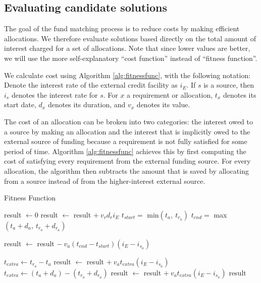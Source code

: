 \documentclass{sig-alternate}
\begin{document}
\subsection{Evaluating candidate solutions}
The goal of the fund matching process is to reduce costs by making efficient allocations. We therefore evaluate solutions based directly on the total amount of interest charged for a set of allocations. Note that since lower values are better, we will use the more self-explanatory ``cost function'' instead of ``fitness function''.

We calculate cost using Algorithm \ref{alg:fitnessfunc}, with the following notation: \\
Denote the interest rate of the external credit facility as $i_{E}$. If $s$ is a source, then $i_s$ denotes the interest rate for $s$. For $x$ a requirement or allocation, $t_x$ denotes its start date, $d_x$ denotes its duration, and $v_x$ denotes its value.

The cost of an allocation can be broken into two categories: the interest owed to a source by making an allocation and the interest that is implicitly owed to the external source of funding because a requirement is not fully satisfied for some period of time. Algorithm \ref{alg:fitnessfunc} achieves this by first computing the cost of satisfying every requirement  from the external funding source. For every allocation, the algorithm then subtracts the amount that is saved by allocating from a source instead of from the higher-interest external source.
\begin{algorithm}
\caption{Fitness Function} \label{alg:fitnessfunc}
\begin{algorithmic}[1]
	\State result $\gets 0$
		\State result $\gets$ result $+ ~v_r d_r i_{E}$
	\EndFor
		\State $t_{start} =$ min$(t_a, ~t_{r_a})$
		\State $t_{end} =$ max$(t_a + d_a, ~t_{r_a} + d_{r_a})$
		
		\State result $\gets$ result $- ~v_a (t_{end}-t_{start}) (i_{E} - i_{s_a})$
	
			\State $t_{extra} \gets t_{r_a} - t_a$
			\State result $\gets$ result $+ ~v_a t_{extra} (i_{E} - i_{s_a})$
		\EndIf
			\State $t_{extra} \gets (t_a + d_a) - (t_{r_a} + d_{r_a})$
			\State result $\gets$ result $+ ~v_a t_{extra} (i_{E} - i_{s_a})$
		\EndIf
	\EndFor
	\State \Return result
\end{algorithmic}
\end{algorithm}
\end{document}
